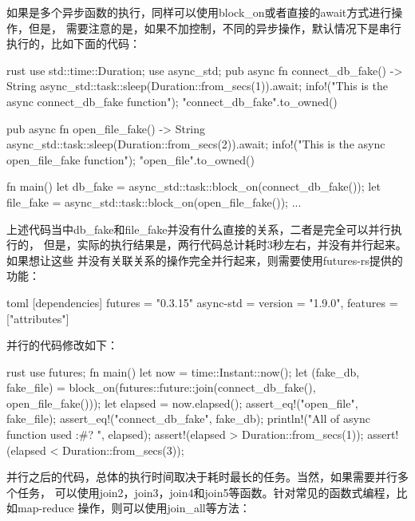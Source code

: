 如果是多个异步函数的执行，同样可以使用block\_on或者直接的await方式进行操作，但是，
需要注意的是，如果不加控制，不同的异步操作，默认情况下是串行执行的，比如下面的代码：
\begin{code-block}{rust}
use std::time::Duration;
use async_std;
pub async fn connect_db_fake() -> String {
    async_std::task::sleep(Duration::from_secs(1)).await;
    info!("This is the async connect_db_fake function");
    "connect_db_fake".to_owned()
}

pub async fn open_file_fake() -> String {
    async_std::task::sleep(Duration::from_secs(2)).await;
    info!("This is the async open_file_fake function");
    "open_file".to_owned()
}

fn main() {
    let db_fake = async_std::task::block_on(connect_db_fake());
    let file_fake = async_std::task::block_on(open_file_fake());
    ...
}
\end{code-block}
上述代码当中db\_fake和file\_fake并没有什么直接的关系，二者是完全可以并行执行的，
但是，实际的执行结果是，两行代码总计耗时3秒左右，并没有并行起来。如果想让这些
并没有关联关系的操作完全并行起来，则需要使用futures-rs提供的功能：
\begin{code-block}{toml}
[dependencies]
futures = "0.3.15"
async-std = {version = "1.9.0", features = ["attributes"]}
\end{code-block}
并行的代码修改如下：
\begin{code-block}{rust}
use futures;
fn main() {
    let now = time::Instant::now();
    let (fake_db, fake_file) =
        block_on(futures::future::join(connect_db_fake(), open_file_fake()));
    let elapsed = now.elapsed();
    assert_eq!("open_file", fake_file);
    assert_eq!("connect_db_fake", fake_db);
    println!("All of async function used {:#?} ", elapsed);
    assert!(elapsed > Duration::from_secs(1));
    assert!(elapsed < Duration::from_secs(3));
}
\end{code-block}
并行之后的代码，总体的执行时间取决于耗时最长的任务。当然，如果需要并行多个任务，
可以使用join2，join3，join4和join5等函数。针对常见的函数式编程，比如map-reduce
操作，则可以使用join\_all等方法：
